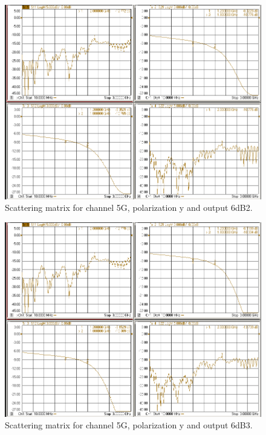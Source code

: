 \documentclass[12pt,a4paper,oneside]{article}
\begin{document}
\begin{figure}[H]
\centering
\includegraphics[width=0.9\linewidth]{VNA_results/5Gy_6dB2.png}
\caption{Scattering matrix for channel 5G, polarization y and output 6dB2.}
\label{fig:5Gy_6dB2}
\end{figure}


\begin{figure}[H]
\centering
\includegraphics[width=0.9\linewidth]{VNA_results/5Gy_6dB3.png}
\caption{Scattering matrix for channel 5G, polarization y and output 6dB3.}
\label{fig:5Gy_6dB3}
\end{figure}
\end{document}
